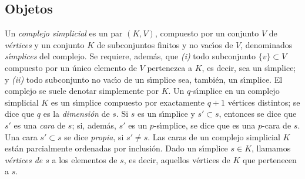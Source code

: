 \theoremstyle{plain}
\newtheorem{lemaSubcomplejoPleno}{Lema}[section]

\theoremstyle{remark}
\newtheorem{obsGeneradoPorVertices}{Observaci\'{o}n}[section]
\newtheorem{obsSubcomplejoPleno}[obsGeneradoPorVertices]{Observaci\'{o}n}
\newtheorem{obsParesSimpliciales}[obsGeneradoPorVertices]{Observaci\'{o}n}


\subsection{Objetos}
Un \emph{complejo simplicial} es un par $(K,V)$, compuesto por un conjunto
$V$ de \emph{v\'{e}rtices} y un conjunto $K$ de subconjuntos finitos y no
vac\'{\i}os de $V$, denominados \emph{s\'{\i}mplices} del complejo. Se
requiere, adem\'{a}s, que \emph{(i)} todo subconjunto $\{v\}\subset V$
compuesto por un \'{u}nico elemento de $V$ pertenezca a $K$, es decir,
sea un s\'{\i}mplice; y \emph{(ii)} todo subconjunto no vac\'{\i}o de un
s\'{\i}mplice sea, tambi\'{e}n, un s\'{\i}mplice. El complejo se suele
denotar simplemente por $K$.
Un $q$-s\'{\i}mplice en un complejo simplicial $K$ es un s\'{\i}mplice
compuesto por exactamente $q+1$ v\'{e}rtices distintos; se dice que $q$ es
la \emph{dimensi\'{o}n} de $s$. Si $s$ es un s\'{\i}mplice y $s'\subset s$,
entonces se dice que $s'$ es una \emph{cara} de $s$; si, adem\'{a}s, $s'$ es
un $p$-s\'{\i}mplice, se dice que es una $p$-cara de $s$. Una cara
$s'\subset s$ se dice \emph{propia}, si $s'\not= s$. Las caras de un
complejo simplicial $K$ est\'{a}n parcialmente ordenadas por inclusi\'{o}n.
Dado un s\'{\i}mplice $s\in K$, llamamos \emph{v\'{e}rtices de $s$} a los
elementos de $s$, es decir, aquellos v\'{e}rtices de $K$ que pertenecen
a $s$.

